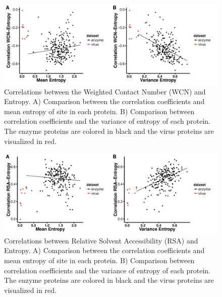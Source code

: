 \documentclass[12pt]{article}
\begin{document}
    \begin{figure}[H]
            \centerline{\includegraphics[width=7.5in]{entropy_wcn_cor.pdf}}     
            \caption{Correlations between the Weighted Contact Number (WCN) and Entropy. A) Comparison between the correlation coefficients and mean entropy of site in each protein. B) Comparison between correlation coefficients and the variance of entropy of each protein. The enzyme proteins are colored in black and the virus proteins are visualized in red.}
            \label{fig:entropy_wcn_cor}
    \end{figure}

    \begin{figure}[H]
            \centerline{\includegraphics[width=7.5in]{entropy_rsa_cor.pdf}}     
            \caption{Correlations between Relative Solvent Accessibility (RSA) and Entropy. A) Comparison between the correlation coefficients and mean entropy of site in each protein. B) Comparison between correlation coefficients and the variance of entropy of each protein. The enzyme proteins are colored in black and the virus proteins are visualized in red.}
            \label{fig:entropy_rsa_cor}
    \end{figure}
        
\end{document}
